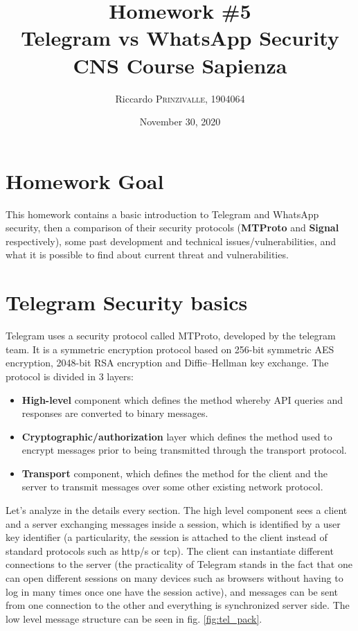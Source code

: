 \documentclass{article}
\title{Homework \#5 \\Telegram vs WhatsApp Security \\[0.2em]\small{}CNS Course Sapienza} %
\author{Riccardo \textsc{Prinzivalle}, 1904064} %
\date{November 30, 2020} %
\begin{document}
\maketitle %


\section{Homework Goal}

This homework contains a basic introduction to Telegram and WhatsApp security, then a comparison of their security protocols (\textbf{MTProto} and \textbf{Signal} respectively), some past development and technical issues/vulnerabilities, and what it is possible to find about current threat and vulnerabilities.


\section{Telegram Security basics}

Telegram uses a security protocol called MTProto, developed by the telegram team. It is a symmetric encryption protocol based on 256-bit symmetric AES encryption, 2048-bit RSA encryption and Diffie–Hellman key exchange. The protocol is divided in 3 layers:

\begin{itemize}
	\item \textbf{High-level} component which defines the method whereby API queries and responses are converted to binary messages.
	\item  \textbf{Cryptographic/authorization} layer which defines the method used to encrypt messages prior to being transmitted through the transport protocol.
	\item  \textbf{Transport} component, which defines the method for the client and the server to transmit messages over some other existing network protocol.
\end{itemize}

Let's analyze in the details every section. The high level component sees a client and a server exchanging messages inside a session, which is identified by a user key identifier (a particularity, the session is attached to the client instead of standard protocols such as http/s or tcp). The client can instantiate different connections to the server (the practicality of Telegram stands in the fact that one can open different sessions on many devices such as browsers without having to log in many times once one have the session active), and messages can be sent from one connection to the other and everything is synchronized server side. The low level message structure can be seen in fig. \ref{fig:tel_pack}.
\end{document}
